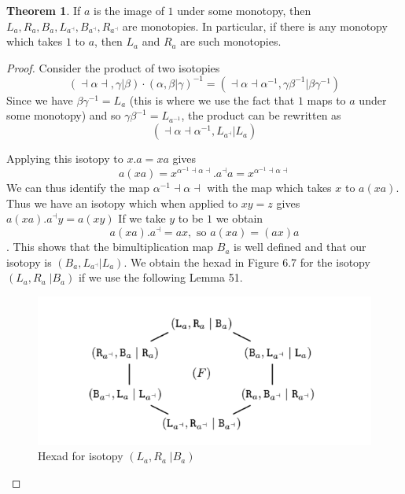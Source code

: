 \documentclass[11pt]{report}
\theoremstyle{plain}
\theoremstyle{definition}
\newtheorem{theorem}{Theorem}
\begin{document}
\begin{theorem}
	If $ a $ is the image of $ 1 $ under some monotopy, then $ L_a, R_{a}, B_{a}, L_{a^\dashv}, B_{a^\dashv}, R_{a^\dashv} $ are monotopies. In particular, if there is any monotopy which takes $ 1 $ to $ a $, then  $ L_a $ and $ R_a $ are such monotopies.
\end{theorem}
\begin{proof}
Consider the product of two isotopies 
$$(\dashv \alpha \dashv , \gamma | \beta)\cdot(\alpha, \beta | \gamma)^{-1} = ( \dashv \alpha \dashv \alpha^{-1} , \gamma \beta^{-1} | \beta \gamma^{-1})$$
Since we have $ \beta \gamma^{-1}  = L_a $ (this is where we use the fact that $ 1 $ maps to $ a $ under some monotopy) and so $ \gamma \beta^{-1} = L_{a^{-1}} $, the product can be rewritten as $$ ( \dashv \alpha \dashv \alpha^{-1} , L_{a^\dashv} | L_a) $$

Applying this isotopy to $ x.a =xa $ gives 
$$a(xa) = x^{\alpha^{-1}\dashv \alpha \dashv}.a^\dashv a = x^{\alpha^{-1}\dashv \alpha \dashv}$$
We can thus identify the map $ \alpha^{-1}\dashv \alpha \dashv $ with the map which takes $ x $ to $ a(xa). $
Thus we have an isotopy which when applied to $ xy=z  $ gives $ a(xa).a^\dashv y = a(xy) $ If we take $ y $ to be $ 1 $ we obtain 
$$ a(xa).a^\dashv = ax, \text{ so } a(xa) = (ax)a$$. This shows that the bimultiplication map $ B_a $ is well defined and that our isotopy is $ ( B_a , L_{a^\dashv} | L_a) $. We obtain the hexad in Figure 6.7 for the isotopy $ (L_a, R_a \;| B_a) $ if we use the following Lemma 51.  

\begin{figure}[h]
	\includegraphics[scale = 0.9]{onqando6}
	\centering
	\caption{Hexad for isotopy $ (L_a, R_a \;| B_a) $ }
\end{figure}

\end{proof}
\end{document}
